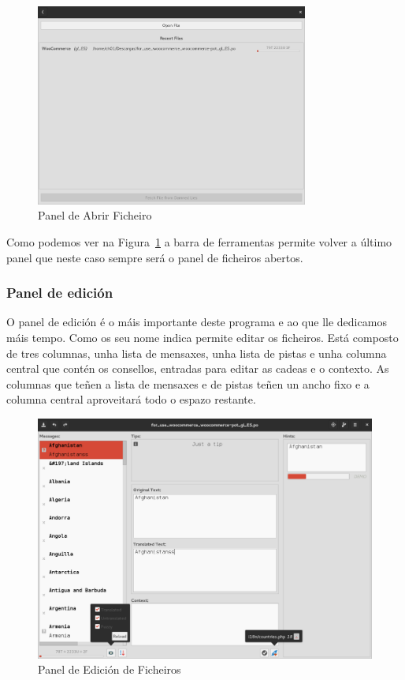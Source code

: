 \begin{figure}[h!]
  \centering
    \includegraphics[width=0.8\textwidth]{img/panel_abrir_ficheiro.png}
    \caption{Panel de Abrir Ficheiro}
    \label{fig:ui:panel:openfile}
\end{figure}

Como podemos ver na Figura~\ref{fig:ui:panel:openfile} a barra de ferramentas permite volver a último panel que neste caso sempre será o panel de ficheiros abertos.

\subsubsection{Panel de edición}

O panel de edición é o máis importante deste programa e ao que lle dedicamos máis tempo. Como os seu nome indica permite editar os ficheiros. Está composto de tres columnas, unha lista de mensaxes, unha lista de pistas e unha columna central que contén os consellos, entradas para editar as cadeas e o contexto. As columnas que teñen a lista de mensaxes e de pistas teñen un ancho fixo e a columna central aproveitará todo o espazo restante.

\begin{figure}[hp!]
    \centering
    \includegraphics[angle=90,width=\textwidth]{img/panel_edicion.png}
    \caption{Panel de Edición de Ficheiros}
    \label{fig:ui:panel:edit}
\end{figure}


